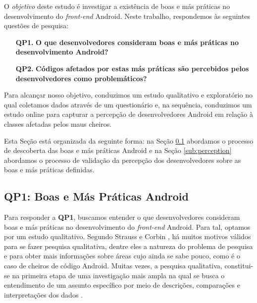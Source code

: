 O \emph{objetivo} deste estudo é investigar a existência de boas e más práticas no desenvolvimento do \textit{front-end} Android. Neste trabalho, respondemos às seguintes questões de pesquisa:

\begin{itemize}
	\sloppy
	\item[\textbf{QP1.}] \textbf{O que desenvolvedores consideram boas e más práticas no desenvolvimento Android?}


	\item[\textbf{QP2.}] \textbf{Códigos afetados por estas más práticas são percebidos pelos desenvolvedores como problemáticos?}
\end{itemize}

Para alcançar nosso objetivo, conduzimos um estudo qualitativo e exploratório no qual coletamos dados através de um questionário e, na sequência, conduzimos um estudo online para capturar a percepção de desenvolvedores Android em relação à classes afetadas pelos maus cheiros. 


Esta Seção está organizada da seguinte forma: na Seção \ref{sub:smells} abordamos o processo de descoberta das boas e más práticas Android e na Seção \ref{sub:perception} abordamos o processo de validação da percepção dos desenvolvedores sobre as boas e más práticas definidas. 

\subsection{QP1: Boas e Más Práticas Android}
\label{sub:smells}

Para responder a \textbf{QP1}, buscamos entender o que desenvolvedores consideram boas e más práticas no desenvolvimento do \textit{front-end} Android. Para tal, optamos por um estudo qualitativo.
Segundo Strauss e Corbin \cite{Strauss2007}, há muitos motivos válidos para se fazer pesquisa qualitativa, dentre eles a natureza do problema de pesquisa e para obter mais informações sobre áreas cujo ainda se sabe pouco, como é o caso de cheiros de código Android. Muitas vezes, a pesquisa qualitativa, constitui-se na primeira etapa de uma investigação mais ampla na qual se busca o entendimento de um assunto específico por meio de descrições, comparações e interpretações dos dados \cite{Prikladnicki, Prates2015}.

